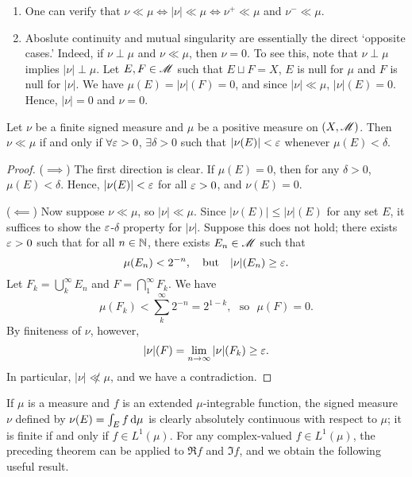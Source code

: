 \documentclass[12pt]{article} %
\begin{document}
\begin{remark}
    \begin{enumerate}
        \item One can verify that $\nu \ll \mu \iff |\nu| \ll \mu \iff \nu^+ \ll \mu$ and $\nu^- \ll \mu$.
        \item Aboslute continuity and mutual singularity are essentially the direct `opposite cases.' Indeed, if $\nu \perp \mu$ and $\nu \ll \mu$, then $\nu = 0$.
        To see this, note that $\nu \perp \mu$ implies $|\nu| \perp \mu$. Let $E, F \in \mathscr{M}$ such that $E \sqcup F = X$, $E$ is null for $\mu$ and $F$ is null for $|\nu|$. We have $\mu(E) = |\nu|(F) = 0$, and since $|\nu| \ll \mu$, $|\nu|(E) = 0$. Hence, $|\nu| = 0$ and $\nu = 0$.
    \end{enumerate}
\end{remark}

\begin{theorem}\label{thm:measure-absolute-continuity}
    Let $\nu$ be a finite signed measure and $\mu$ be a positive measure on $(X, \mathscr{M})$. Then $\nu \ll \mu$ if and only if $\forall \varepsilon > 0$, $\exists \delta > 0$ such that $|\nu(E)| < \varepsilon$ whenever $\mu(E) < \delta$.
\end{theorem}

\begin{proof}
    ($\implies$) The first direction is clear. If $\mu(E) = 0$, then for any $\delta > 0$, $\mu(E) < \delta$. Hence, $|\nu(E)| < \varepsilon$ for all $\varepsilon > 0$, and $\nu(E) = 0$.

    ($\impliedby$) Now suppose $\nu \ll \mu$, so $|\nu| \ll \mu$. Since $|\nu(E)| \leq |\nu|(E)$ for any set $E$, it suffices to show the $\varepsilon$-$\delta$ property for $|\nu|$. Suppose this does not hold; there exists $\varepsilon > 0$ such that for all $n \in \mathbb{N}$, there exists $E_n \in \mathscr{M}$ such that \[\mu(E_n) < 2^{-n}, \ \ \ \text{but} \ \ \ |\nu|(E_n) \geq \eps.\] Let $F_k = \bigcup_k^\infty E_n$ and $F = \bigcap_1^\infty F_k$. We have \[\mu(F_k) < \sum_k^\infty 2^{-n} = 2^{1-k}, \ \ \ \text{so} \ \ \ \mu(F) = 0.\] By finiteness of $\nu$, however, \[|\nu|(F) = \lim_{n \to \infty} |\nu|(F_k) \geq \varepsilon.\] In particular, $|\nu| \not\ll \mu$, and we have a contradiction.
\end{proof}

If $\mu$ is a measure and $f$ is an extended $\mu$-integrable function, the signed measure $\nu$ defined by $\nu(E) = \int_E f \, \mathrm{d} \mu$ is clearly absolutely continuous with respect to $\mu$; it is finite if and only if $f \in L^1(\mu)$. For any complex-valued $f \in L^1(\mu)$, the preceding theorem can be applied to $\Re f$ and $\Im f$, and we obtain the following useful result.
\end{document}
